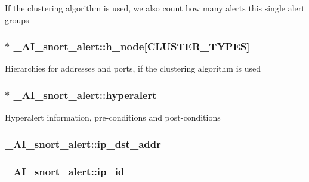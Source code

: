 \label{struct__AI__snort__alert_a285aff12d6bac03c316ccc5305d28e53}
If the clustering algorithm is used, we also count how many alerts this single alert groups \hypertarget{struct__AI__snort__alert_ac53765584296ead1328eabfaba8a3aed}{
\subsubsection[{h\_\-node}]{$\ast$ {\bf \_\-AI\_\-snort\_\-alert::h\_\-node}\mbox{[}CLUSTER\_\-TYPES\mbox{]}}}
\label{struct__AI__snort__alert_ac53765584296ead1328eabfaba8a3aed}
Hierarchies for addresses and ports, if the clustering algorithm is used \hypertarget{struct__AI__snort__alert_ac101de15b4f9451f235b82122f77b62a}{
\subsubsection[{hyperalert}]{$\ast$ {\bf \_\-AI\_\-snort\_\-alert::hyperalert}}}
\label{struct__AI__snort__alert_ac101de15b4f9451f235b82122f77b62a}
Hyperalert information, pre-\/conditions and post-\/conditions \hypertarget{struct__AI__snort__alert_a754ca683593c838e4032fa8c13b1512b}{
\subsubsection[{ip\_\-dst\_\-addr}]{ {\bf \_\-AI\_\-snort\_\-alert::ip\_\-dst\_\-addr}}}
\label{struct__AI__snort__alert_a754ca683593c838e4032fa8c13b1512b}
\hypertarget{struct__AI__snort__alert_a2fc673dec85a7b49dd16ac7c0bb1bb78}{
\subsubsection[{ip\_\-id}]{ {\bf \_\-AI\_\-snort\_\-alert::ip\_\-id}}}
